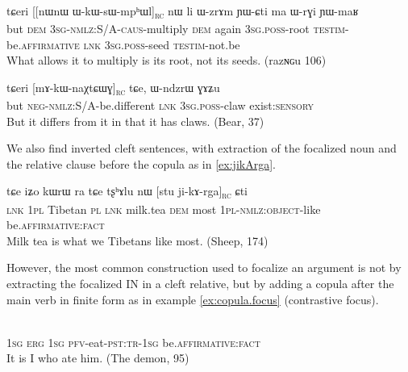 \documentclass[oldfontcommands,oneside,a4paper,11pt]{article}
\newcommand{\ipa}[1]{{\phon #1}} %
\newcommand{\rc}{\textsubscript{\textsc{rc}}}
\begin{document}
\begin{exe}
\ex \label{ex:WkWsWmphWl}
\gll 
\ipa{tɕeri}  	[[\ipa{nɯnɯ}  	\ipa{ɯ-kɯ-sɯ-mpʰɯl}]\rc{}  	\ipa{nɯ}  	\ipa{li}  	\ipa{ɯ-zrɤm}  	\ipa{ɲɯ-ɕti}  	\ipa{ma}  	\ipa{ɯ-rɣi}  	\ipa{ɲɯ-maʁ}  \\
but \textsc{dem} \textsc{3sg-nmlz:S/A-caus}-multiply \textsc{dem} again \textsc{3sg.poss}-root \textsc{testim}-be.\textsc{affirmative} \textsc{lnk} \textsc{3sg.poss}-seed \textsc{testim}-not.be \\
\glt What allows it to multiply is its root, not its seeds. (\ipa{razɴɢu} 106)
\end{exe}


\begin{exe}
\ex \label{ex:mAkWnaXtCMG}
\gll 
\ipa{tɕeri}  	[\ipa{mɤ-kɯ-naχtɕɯɣ}]\rc{}  	\ipa{tɕe,}  	\ipa{ɯ-ndzrɯ}  	\ipa{ɣɤʑu}\\
but \textsc{neg-nmlz}:S/A-be.different \textsc{lnk} \textsc{3sg.poss}-claw exist:\textsc{sensory}\\
\glt But it differs from it in that it has claws. (Bear, 37) 
\end{exe}

We also find inverted cleft sentences, with extraction of the focalized noun and the relative clause before the copula as in \ref{ex:jikArga}.

\begin{exe}
\ex \label{ex:jikArga}
\gll 
\ipa{tɕe}  	\ipa{iʑo}  	\ipa{kɯrɯ}  	\ipa{ra}  	\ipa{tɕe}  	\ipa{tʂʰɤlu}  	\ipa{nɯ}  	[\ipa{stu}  	\ipa{ji-kɤ-rga}]\rc{}  	\ipa{ɕti}  \\
\textsc{lnk} \textsc{1pl} Tibetan \textsc{pl} \textsc{lnk} milk.tea \textsc{dem} most \textsc{1pl-nmlz:object}-like be.\textsc{affirmative:fact} \\
\glt Milk tea is what we Tibetans like most.  (Sheep, 174)
\end{exe}

However, the most common construction used to focalize an argument is not by extracting the focalized IN in a cleft relative, but by adding a copula  after the main verb in finite form as in example  \ref{ex:copula.focus} (contrastive focus).  

\begin{exe}
\ex \label{ex:copula.focus}
\gll 
  	[\ipa{aʑo}  	\ipa{kɯ}  	\ipa{ɯʑo}  	\ipa{tɤ-ndza-t-a}]  	\ipa{ɕti}  \\
  \textsc{1sg} \textsc{erg} \textsc{1sg} \textsc{pfv}-eat-\textsc{pst:tr-1sg} be.\textsc{affirmative:fact}\\
\glt It is I who ate him. (The demon, 95)
\end{exe}
\end{document}
